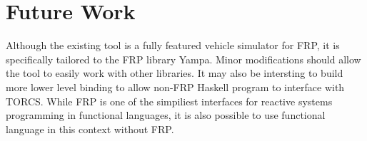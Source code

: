 \section{Future Work}

Although the existing tool is a fully featured vehicle simulator for FRP, it is specifically tailored to the FRP library Yampa.
Minor modifications should allow the tool to easily work with other libraries.
It may also be intersting to build more lower level binding to allow non-FRP Haskell program to interface with TORCS.
While FRP is one of the simpiliest interfaces for reactive systems programming in functional languages, it is also possible to use functional language in this context without FRP.

